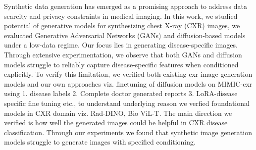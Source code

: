 


Synthetic data generation has emerged as a promising approach to address data scarcity and 
privacy constraints in medical imaging. In this work, we studied potential of generative 
models for synthesizing chest X-ray (CXR) images, we evaluated Generative Adversarial Networks (GANs) 
and diffusion-based models under a low-data regime. Our focus lies in generating disease-specific 
images. Through extensive experimentation, we observe that both GANs and diffusion models struggle to 
reliably capture disease-specific features when conditioned explicitly. To verify this limitation, 
we verified both existing cxr-image generation models and our own approaches viz. finetuning of diffusion models on MIMIC-cxr using 
1. disease labels 2. Complete doctor generated reports 3. LoRA-disease specific fine tuning etc., to understand underlying reason we 
verfied foundational models in CXR domain viz. Rad-DINO, Bio ViL-T. The main direction we verified is how well the generated images 
could be helpful in CXR disease classification. Through our experiments we found that synthetic image generation models 
struggle to generate images with specified conditioning. 


